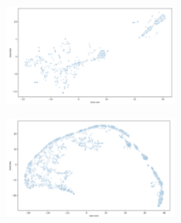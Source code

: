 \begin{figure}[h]
  \centering
  \includegraphics[width=0.5\textwidth]{./images/tsne10Files.png}
  \caption{}
  \label{figure:tsne10Files}
\end{figure}

\begin{figure}[h]
  \centering
  \includegraphics[width=0.5\textwidth]{./images/tsne10Files2Features.png}
  \caption{}
  \label{figure:tsne10Files2Features}
\end{figure}

